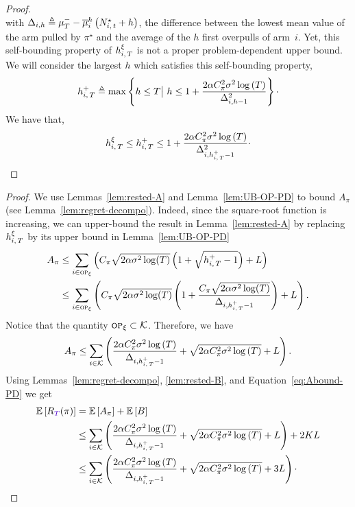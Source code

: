 \begin{proof}
\[\] 
with $\Delta_{i,h} \triangleq \mu^-_T- \overline{\mu}_i^h\left( N_{i,\,t}^\star+h \right)$, the difference between the lowest mean value of the arm pulled by $\pi^\star$ and the average of the $h$ first overpulls of arm~$i$. Yet, this self-bounding property of $h_{i,\,T}^\xi $ is not a proper problem-dependent upper bound. We will consider the largest $h$ which satisfies this self-bounding property, 
\begin{equation*}
 \hiT^+  \triangleq \max \left\{ h \leq T \big| \ h \leq  1 + \frac{2\alpha C_\pi^2 \sigma^2 \log \pa{T}}{\Delta_{i,h-1}^2} \right\}\cdot
\end{equation*}
We have that,
\begin{equation*}
h_{i,\,T}^\xi \leq  h_{i,\,T}^+  \leq  1 + \frac{2\alpha C_\pi^2 \sigma^2 \log \left(T\right)}{\Delta_{i,h_{i,\,T}^+-1}^2}\cdot
\end{equation*}
\end{proof}
\restaalgoub*
\begin{proof}
We use Lemmas~\ref{lem:rested-A} and Lemma~\ref{lem:UB-OP-PD} to bound $A_\pi$ (see Lemma~\ref{lem:regret-decompo}). Indeed, since the square-root function is increasing, we can upper-bound the result in Lemma~\ref{lem:rested-A} by replacing $h_{i,\,T}^\xi$ by its upper bound in Lemma~\ref{lem:UB-OP-PD}
\begin{align*}
A_{\pi} &\leq \sum_{i\in \textsc{op}_\xi} \left(C_\pi\sqrt{2\alpha\sigma^2\log(T)} \left( 1 + \sqrt{h_{i,\,T}^+ - 1}\right) + L\right)\\
& \leq \sum_{i\in \textsc{op}_\xi} \left(C_\pi\sqrt{2\alpha\sigma^2\log(T)} \left( 1 + \frac{C_\pi\sqrt{2\alpha\sigma^2\log(T)}}{\Delta_{i,h_{i,\,T}^+-1}}\right) + L\right). 
\end{align*}
Notice that the quantity $\textsc{op}_\xi \subset \mathcal{K}$. Therefore, we have 
\begin{equation}
\label{eq:Abound-PD}
A_{\pi} \leq \sum_{i\in \mathcal{K}} \left(\frac{2\alpha C_\pi^2\sigma^2\log\left(T\right)}{\Delta_{i,h_{i,\,T}^+-1}} + \sqrt{2\alpha C_\pi^2\sigma^2\log\left(T\right)} +L \right). 
\end{equation}
Using Lemmas~\ref{lem:regret-decompo}, \ref{lem:rested-B}, and Equation~\ref{eq:Abound-PD} we get
\begin{align*}
\EE{\regret(\pi)} &=\EE{A_{\pi}} + \EE B 
\\&
\leq \sum_{i\in \arms} \pa{\frac{2\alpha C_\pi^2\sigma^2\log\pa{T}}{\Delta_{i,\hiT^+-1}} + \sqrt{2\alpha C_\pi^2\sigma^2\log\pa{T}} +L } + 2KL \\
&\leq \sum_{i\in \arms} \pa{\frac{2\alpha C_\pi^2\sigma^2\log\pa{T}}{\Delta_{i,\hiT^+-1}} + \sqrt{2\alpha C_\pi^2\sigma^2\log\pa{T}} +3L } \cdot
\end{align*}
\end{proof}


